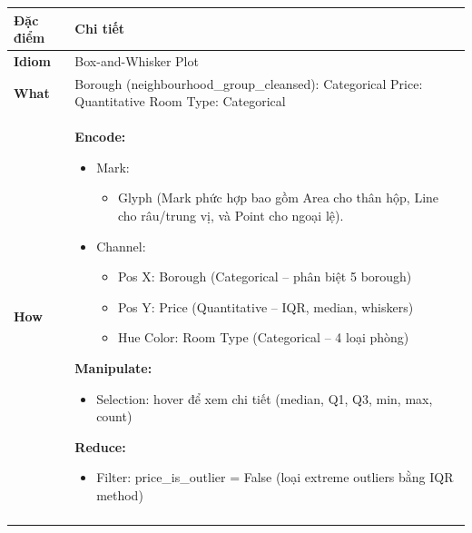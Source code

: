 \begin{longtable}{@{} p{2.8cm} p{12cm} @{}}
\toprule
\textbf{Đặc điểm} & \textbf{Chi tiết} \\
\midrule
\endhead

\bottomrule
\endfoot

\textbf{Idiom} & Box-and-Whisker Plot \\
\addlinespace[0.2cm]

\textbf{What} & Borough (neighbourhood\_group\_cleansed): Categorical \newline
Price: Quantitative \newline
Room Type: Categorical \\
\addlinespace[0.2cm]

\textbf{How} & \textbf{Encode:}
\begin{itemize}[nosep, leftmargin=*, topsep=0.1cm]
    \item Mark:
    \begin{itemize}[nosep, leftmargin=0.5cm]
        \item Glyph (Mark phức hợp bao gồm Area cho thân hộp, Line cho râu/trung vị, và Point cho ngoại lệ).
    \end{itemize}
    \item Channel:
    \begin{itemize}[nosep, leftmargin=0.5cm]
        \item Pos X: Borough (Categorical -- phân biệt 5 borough)
        \item Pos Y: Price (Quantitative -- IQR, median, whiskers)
        \item Hue Color: Room Type (Categorical -- 4 loại phòng)
    \end{itemize}
\end{itemize}

\vspace{0.2cm}
\textbf{Manipulate:}
\begin{itemize}[nosep, leftmargin=*, topsep=0.1cm]
    \item Selection: hover để xem chi tiết (median, Q1, Q3, min, max, count)
\end{itemize}

\vspace{0.2cm}
\textbf{Reduce:}
\begin{itemize}[nosep, leftmargin=*, topsep=0.1cm]
    \item Filter: price\_is\_outlier = False (loại extreme outliers bằng IQR method)
\end{itemize} \\
\addlinespace[0.2cm]


\end{longtable}
